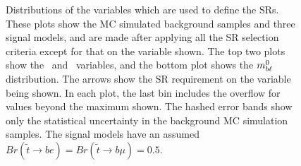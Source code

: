 \begin{figure}
  \centering
  \caption{
    Distributions of the variables which are used to define the SRs.
    These plots show the MC simulated background samples and three signal
    models, and are made after applying all the SR selection criteria except for
    that on the variable shown.
    The top two plots show the \HT\ and \MBLASYM\ variables, and the bottom
    plot shows the $m_{b\ell}^0$ distribution.
    The arrows show the SR requirement on the variable being shown.
    In each plot, the last bin includes the overflow for values beyond the
    maximum shown.
    The hashed error bands show only the statistical uncertainty in the
    background MC simulation samples.
    The signal models have an assumed
    $Br(\tilde{t}\rightarrow be) = Br(\tilde{t}\rightarrow b\mu) = 0.5$.
  }
  \label{fig:n_minus_one_sr}
\end{figure}

